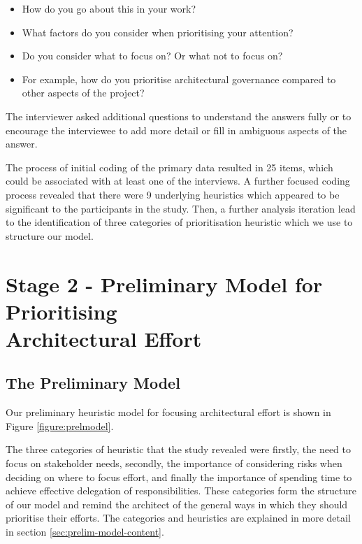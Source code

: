 \begin{itemize}
	\item How do you go about this in your work? 
	\item What factors do you consider when prioritising your attention? 
	\item Do you consider what to focus on?   Or what not to focus on? 
	\item For example, how do you prioritise architectural governance compared to other aspects of the project?
\end{itemize}

The interviewer asked additional questions to understand the answers fully or to encourage the interviewee to add more detail or fill in ambiguous aspects of the answer.

The process of initial coding of the primary data resulted in 25 items, which could be associated with at least one of the interviews.  A further focused coding process revealed that there were 9 underlying heuristics which appeared to be significant to the participants in the study. Then, a further analysis iteration lead to the identification of three categories of prioritisation heuristic which we use to structure our model.

\section{Stage 2 - Preliminary Model for Prioritising \\Architectural Effort}
\subsection{The Preliminary Model}

Our preliminary heuristic model for focusing architectural effort is shown in Figure \ref{figure:prelmodel}.
 
The three categories of heuristic that the study revealed were firstly, the need to focus on stakeholder needs, secondly, the importance of considering risks when deciding on where to focus effort, and finally the importance of spending time to achieve effective delegation of responsibilities.  These categories form the structure of our model and remind the architect of the general ways in which they should prioritise their efforts. The categories and heuristics are explained in more detail in section \ref{sec:prelim-model-content}.

